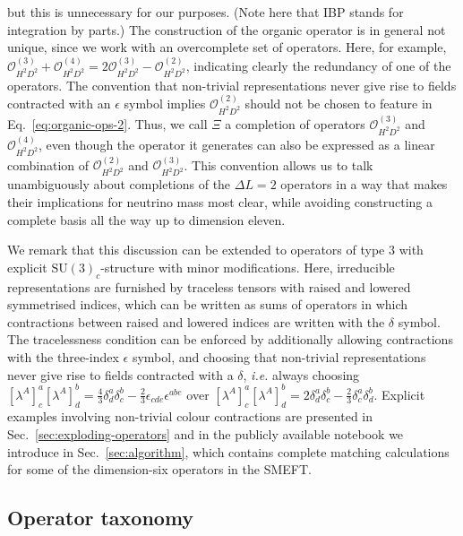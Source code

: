 but this is unnecessary for our purposes. (Note here that IBP stands for
integration by parts.) The construction of the organic operator is in general
not unique, since we work with an overcomplete set of operators. Here, for
example,
$\mathcal{O}_{H^{2}D^{2}}^{(3)} + \mathcal{O}_{H^{2}D^{2}}^{(4)} = 2\mathcal{O}_{H^{2}D^{2}}^{(3)} - \mathcal{O}_{H^{2}D^{2}}^{(2)}$,
indicating clearly the redundancy of one of the operators. The convention that
non-trivial representations never give rise to fields contracted with an
$\epsilon$ symbol implies $\mathcal{O}^{(2)}_{H^{2}D^{2}}$ should not be chosen
to feature in Eq.~\eqref{eq:organic-ops-2}. Thus, we call $\Xi$ a completion of
operators $\mathcal{O}_{H^{2}D^{2}}^{(3)}$ and $\mathcal{O}_{H^{2}D^{2}}^{(4)}$,
even though the operator it generates can also be expressed as a linear
combination of $\mathcal{O}^{(2)}_{H^{2}D^{2}}$ and
$\mathcal{O}^{(3)}_{H^{2}D^{2}}$. This convention allows us to talk
unambiguously about completions of the $\Delta L = 2$ operators in a way that
makes their implications for neutrino mass most clear, while avoiding
constructing a complete basis all the way up to dimension eleven.

We remark that this discussion can be extended to operators of type 3 with
explicit $\mathrm{SU}(3)_{c}$-structure with minor modifications. Here,
irreducible representations are furnished by traceless tensors with raised and
lowered symmetrised indices, which can be written as sums of operators in which
contractions between raised and lowered indices are written with the $\delta$
symbol. The tracelessness condition can be enforced by additionally allowing
contractions with the three-index $\epsilon$ symbol, and choosing that
non-trivial representations never give rise to fields contracted with a
$\delta$, \textit{i.e.} always choosing
$[\lambda^{A}]_{c}^{a} [\lambda^{A}]_{d}^{b} = \tfrac{4}{3}\delta^{a}_{d}\delta^{b}_{c} - \tfrac{2}{3}\epsilon_{cde}\epsilon^{abe}$
over
$[\lambda^{A}]_{c}^{a} [\lambda^{A}]_{d}^{b} = 2\delta^{a}_{d}\delta^{b}_{c} - \tfrac{2}{3}\delta^{a}_{c}\delta^{b}_{d}$.
Explicit examples involving non-trivial colour contractions are presented in
Sec.~\ref{sec:exploding-operators} and in the publicly available notebook we
introduce in Sec.~\ref{sec:algorithm}, which contains complete matching
calculations for some of the dimension-six operators in the SMEFT.

\subsection{Operator taxonomy}
\label{sec:operatortaxonomy}

